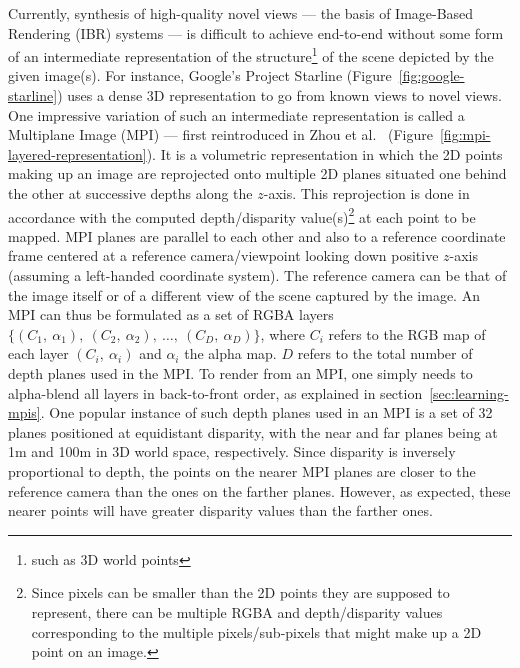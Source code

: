 Currently, synthesis of high-quality novel views --- the basis of Image-Based Rendering (IBR) systems --- is difficult to achieve end-to-end without some form of an intermediate representation of the structure\footnote{such as 3D world points} of the scene depicted by the given image(s). For instance, Google's Project Starline (Figure~\ref{fig:google-starline}) uses a dense 3D representation to go from known views to novel views. One impressive variation of such an intermediate representation is called a Multiplane Image (MPI) --- first reintroduced in Zhou et al.~\cite{zhou2018stereo} (Figure~\ref{fig:mpi-layered-representation}). It is a volumetric representation in which the 2D points making up an image are reprojected onto multiple 2D planes situated one behind the other at successive depths along the $z$-axis. This reprojection is done in accordance with the computed depth/disparity value(s)\footnote{Since pixels can be smaller than the 2D points they are supposed to represent, there can be multiple RGBA and depth/disparity values corresponding to the multiple pixels/sub-pixels that might make up a 2D point on an image.} at each point to be mapped. MPI planes are parallel to each other and also to a reference coordinate frame centered at a reference camera/viewpoint looking down positive $z$-axis (assuming a left-handed coordinate system). The reference camera can be that of the image itself or of a different view of the scene captured by the image. An MPI can thus be formulated as a set of RGBA layers $\{(C_1,\ \alpha_1),\ (C_2,\ \alpha_2),\ \ldots,\ (C_D,\ \alpha_D)\}$, where $C_i$ refers to the RGB map of each layer $(C_i,\ \alpha_i)$ and $\alpha_i$ the alpha map. $D$ refers to the total number of depth planes used in the MPI. To render from an MPI, one simply needs to alpha-blend all layers in back-to-front order, as explained in section~\ref{sec:learning-mpis}. One popular instance of such depth planes used in an MPI is a set of 32 planes positioned at equidistant disparity, with the near and far planes being at 1m and 100m in 3D world space, respectively. Since disparity is inversely proportional to depth, the points on the nearer MPI planes are closer to the reference camera than the ones on the farther planes. However, as expected, these nearer points will have greater disparity values than the farther ones.


